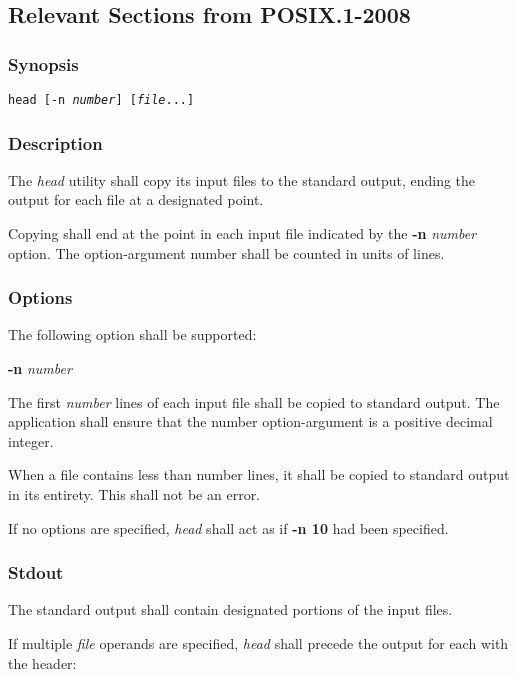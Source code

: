 \documentclass[en, listings]{labreport}
\begin{document}
\newpage

\subsection*{Relevant Sections from POSIX.1-2008}

\subsubsection*{Synopsis}

\noindent
\texttt{head [-n \textit{number}] [\textit{file}...]}

\subsubsection*{Description}

\noindent
The \textit{head} utility shall copy its input files to the standard output,
ending the output for each file at a designated point.

\noindent
Copying shall end at the point in each input file indicated by the
\textbf{-n} \textit{number} option. The option-argument number shall be counted in units of lines.

\subsubsection*{Options}

\noindent
The following option shall be supported:

\textbf{-n} \textit{number}

The first \textit{number} lines of each input file shall be copied to standard output.
The application shall ensure that the number option-argument is a positive decimal integer.

\noindent
When a file contains less than number lines, it shall be copied to standard output
in its entirety. This shall not be an error.

\noindent
If no options are specified, \textit{head} shall act as if \textbf{-n 10} had been specified.

\subsubsection*{Stdout}

\noindent
The standard output shall contain designated portions of the input files.

\noindent
If multiple \textit{file} operands are specified, \textit{head} shall precede
the output for each with the header:
\end{document}
